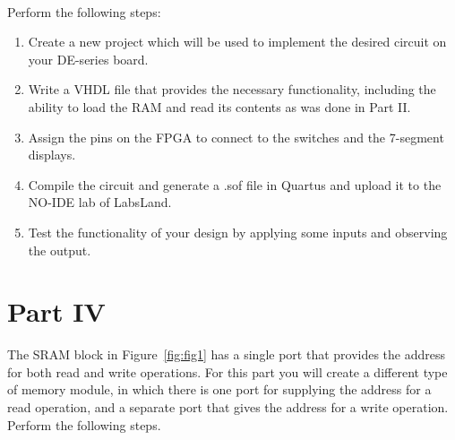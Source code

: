 \documentclass[epsfig,10pt,fullpage]{article}
\begin{document}
~\\
Perform the following steps:

\begin{enumerate}
\item Create a new project which will be used to implement the desired
circuit on your DE-series board.
\item Write a VHDL file that provides the necessary functionality,
including the ability to load the RAM and read its contents as was done in
Part II.
\item Assign the pins on the FPGA to connect to the switches and the 
7-segment displays.
\item Compile the circuit and generate a .sof file in Quartus and upload it to the NO-IDE lab of LabsLand.
\item Test the functionality of your design by applying some inputs
and observing the output.
\end{enumerate}

\section*{Part IV}
The SRAM block in Figure~\ref{fig:fig1} has a single port that provides the address for 
both read and write operations. For this part you will create a different type of memory module,
in which there is one port for supplying the address for a read operation, and a separate
port that gives the address for a write operation. Perform the following steps.
\end{document}
